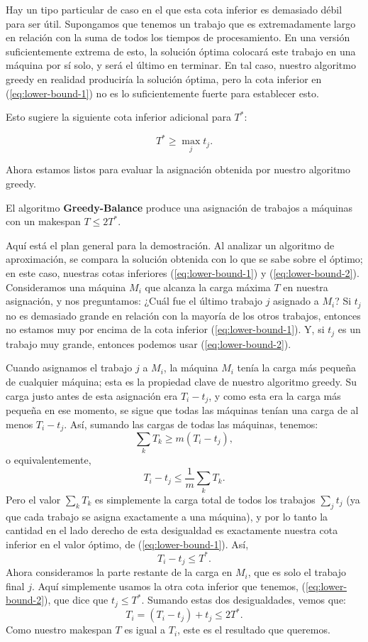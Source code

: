 \documentclass{report}
\begin{document}
	Hay un tipo particular de caso en el que esta cota inferior es demasiado débil para ser útil. Supongamos que tenemos un trabajo que es extremadamente largo en relación con la suma de todos los tiempos de procesamiento. En una versión suficientemente extrema de esto, la solución óptima colocará este trabajo en una máquina por sí solo, y será el último en terminar. En tal caso, nuestro algoritmo greedy en realidad produciría la solución óptima, pero la cota inferior en (\ref{eq:lower-bound-1}) no es lo suficientemente fuerte para establecer esto.
	
	Esto sugiere la siguiente cota inferior adicional para \( T^* \):
	
	\begin{equation} \label{eq:lower-bound-2}
		T^* \geq \max_j t_j.
	\end{equation}
	
	Ahora estamos listos para evaluar la asignación obtenida por nuestro algoritmo greedy.

		El algoritmo \textbf{Greedy-Balance} produce una asignación de trabajos a máquinas con un makespan \( T \leq 2T^* \).
	
		Aquí está el plan general para la demostración. Al analizar un algoritmo de aproximación, se compara la solución obtenida con lo que se sabe sobre el óptimo; en este caso, nuestras cotas inferiores (\ref{eq:lower-bound-1}) y (\ref{eq:lower-bound-2}). Consideramos una máquina \( M_i \) que alcanza la carga máxima \( T \) en nuestra asignación, y nos preguntamos: ¿Cuál fue el último trabajo \( j \) asignado a \( M_i \)? Si \( t_j \) no es demasiado grande en relación con la mayoría de los otros trabajos, entonces no estamos muy por encima de la cota inferior (\ref{eq:lower-bound-1}). Y, si \( t_j \) es un trabajo muy grande, entonces podemos usar (\ref{eq:lower-bound-2}).
		
		Cuando asignamos el trabajo \( j \) a \( M_i \), la máquina \( M_i \) tenía la carga más pequeña de cualquier máquina; esta es la propiedad clave de nuestro algoritmo greedy. Su carga justo antes de esta asignación era \( T_i - t_j \), y como esta era la carga más pequeña en ese momento, se sigue que todas las máquinas tenían una carga de al menos \( T_i - t_j \). Así, sumando las cargas de todas las máquinas, tenemos:
		\[
		\sum_k T_k \geq m(T_i - t_j),
		\]
		o equivalentemente,
		\[
		T_i - t_j \leq \frac{1}{m} \sum_k T_k.
		\]
		Pero el valor \( \sum_k T_k \) es simplemente la carga total de todos los trabajos \( \sum_j t_j \) (ya que cada trabajo se asigna exactamente a una máquina), y por lo tanto la cantidad en el lado derecho de esta desigualdad es exactamente nuestra cota inferior en el valor óptimo, de (\ref{eq:lower-bound-1}). Así,
		\[
		T_i - t_j \leq T^*.
		\]
		Ahora consideramos la parte restante de la carga en \( M_i \), que es solo el trabajo final \( j \). Aquí simplemente usamos la otra cota inferior que tenemos, (\ref{eq:lower-bound-2}), que dice que \( t_j \leq T^* \). Sumando estas dos desigualdades, vemos que:
		\[
		T_i = (T_i - t_j) + t_j \leq 2T^*.
		\]
		Como nuestro makespan \( T \) es igual a \( T_i \), este es el resultado que queremos.
\end{document}
